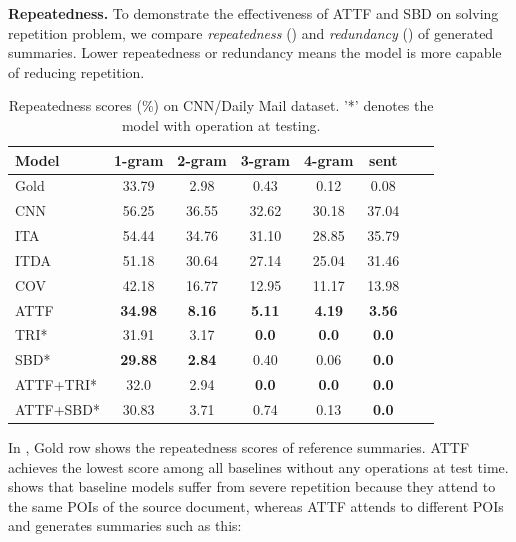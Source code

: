 \textbf{Repeatedness.}
To demonstrate the effectiveness of ATTF and SBD on solving repetition
problem, we compare \textit{repeatedness} () 
and \textit{redundancy} () of generated summaries.
Lower repeatedness or redundancy
means the model is more capable of reducing repetition.

\begin{table}[th]
	\centering
	\scriptsize
	\begin{tabular}{|l|c|c|c|c|c|c|c|}
		\hline
		Model & 1-gram  & 2-gram & 3-gram & 4-gram & sent \\
		\hline
		Gold & 33.79 & 2.98 & 0.43 & 0.12 & 0.08 \\
		\hline
		CNN &  56.25 & 36.55 & 32.62 & 30.18 & 37.04  \\
		ITA & 54.44 & 34.76 &31.10 & 28.85 & 35.79 \\
		ITDA & 51.18 & 30.64 & 27.14 & 25.04 & 31.46 \\
		COV & 42.18 & 16.77 & 12.95 & 11.17 & 13.98  \\
		ATTF & \bf 34.98 & \bf 8.16 & \bf 5.11 & \bf 4.19 & \bf 3.56 \\
        \hline
		TRI* & 31.91 & 3.17 & \bf 0.0 & \bf 0.0 & \bf 0.0 \\
		SBD* & \bf 29.88 & \bf 2.84 & 0.40 & 0.06 & \bf 0.0 \\
		\tiny ATTF+TRI* & 32.0 & 2.94 & \bf 0.0 & \bf 0.0 & \bf 0.0 \\
		\tiny ATTF+SBD* & 30.83 & 3.71 & 0.74 & 0.13 & \bf 0.0 \\
		\hline
	\end{tabular}
	\caption{Repeatedness scores (\%) on CNN/Daily Mail dataset. '*' denotes the model with operation
	at testing.}
	\label{tab:eval_repe}
\end{table}

In , Gold row shows the repeatedness scores of
reference summaries. ATTF achieves the lowest
score among all baselines without any operations at test time. 
 shows that baseline models 
suffer from severe repetition because they attend to the same POIs 
of the source document, whereas 
ATTF attends to different POIs and generates summaries 
such as this:


